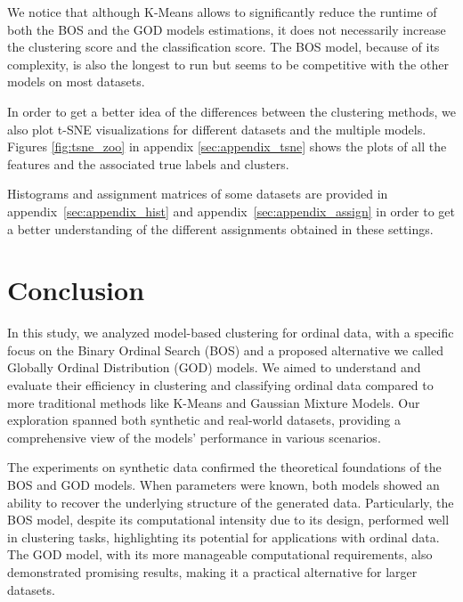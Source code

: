 We notice that although K-Means allows to significantly reduce the runtime of both the BOS and the GOD models estimations, it does not necessarily increase the clustering score and the classification score. The BOS model, because of its complexity, is also the longest to run but seems to be competitive with the other models on most datasets.

In order to get a better idea of the differences between the clustering methods, we also plot t-SNE visualizations \citep{van2008visualizing} for different datasets and the multiple models. Figures \ref{fig:tsne_zoo} in appendix \ref{sec:appendix_tsne} shows the plots of all the features and the associated true labels and clusters.

Histograms and assignment matrices of some datasets are provided in appendix~\ref{sec:appendix_hist} and appendix~\ref{sec:appendix_assign} in order to get a better understanding of the different assignments obtained in these settings.



\section{Conclusion}
In this study, we analyzed model-based clustering for ordinal data, with a specific focus on the Binary Ordinal Search (BOS) and a proposed alternative we called Globally Ordinal Distribution (GOD) models. We aimed to understand and evaluate their efficiency in clustering and classifying ordinal data compared to more traditional methods like K-Means and Gaussian Mixture Models. Our exploration spanned both synthetic and real-world datasets, providing a comprehensive view of the models' performance in various scenarios.

The experiments on synthetic data confirmed the theoretical foundations of the BOS and GOD models. When parameters were known, both models showed an ability to recover the underlying structure of the generated data. Particularly, the BOS model, despite its computational intensity due to its design, performed well in clustering tasks, highlighting its potential for applications with ordinal data. The GOD model, with its more manageable computational requirements, also demonstrated promising results, making it a practical alternative for larger datasets.

